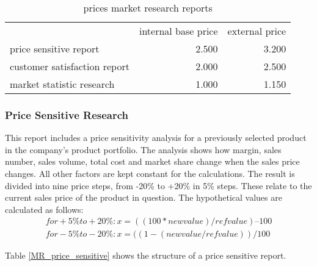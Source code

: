 \begin{table}[ht]
\centering
\begin{tabular}{|l|r|r|}
\hline
                             & internal base price  & external price \\
price sensitive report       & 2.500                & 3.200     \\
customer satisfaction report & 2.000                & 2.500     \\
market statistic research    & 1.000                & 1.150     \\
\hline
\end{tabular}
\caption{prices market research reports}
\label{MR_report_price}
\end{table}



\subsubsection{Price Sensitive Research}
This report includes a price sensitivity analysis for a previously selected product in the company's product portfolio. The analysis shows how margin, sales number, sales volume, total cost and market share change when the sales price changes. All other factors are kept constant for the calculations. The result is divided into nine price steps, from -20\% to +20\% in 5\% steps. These relate to the current sales price of the product in question. The hypothetical values are calculated as follows:
\begin{equation}
    \begin{aligned}
        for +5\% to +20\%: x = ((100 * new value) / ref value) – 100 \\
        for -5\% to -20\%: x = ((1 - (new value / ref value)) / 100
    \end{aligned}
\end{equation}

Table \ref{MR_price_sensitive} shows the structure of a price sensitive report. \\

